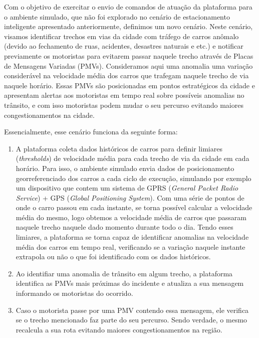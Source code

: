 Com o objetivo de exercitar o envio de comandos de atuação da plataforma para o ambiente simulado, que não foi explorado no cenário de estacionamento inteligente apresentado
anteriormente, definimos um novo cenário.
Neste cenário, visamos identificar trechos em vias da cidade com tráfego de carros anômalo (devido ao fechamento de ruas, acidentes, desastres naturais e etc.) e notificar
previamente os motoristas para evitarem passar naquele trecho através de Placas de Mensagens Variadas (PMVs).
Consideramos aqui uma anomalia uma variação considerável na velocidade média dos carros que trafegam naquele trecho de via naquele horário.
Essas PMVs são posicionadas em pontos estratégicos da cidade e apresentam alertas aos motoristas em tempo real sobre possíveis anomalias no trânsito, e com isso motoristas
podem mudar o seu percurso evitando maiores congestionamentos na cidade.

Essencialmente, esse cenário funciona da seguinte forma:

\begin{enumerate}
    \item A plataforma coleta dados históricos de carros para definir limiares (\textit{thresholds}) de velocidade média para cada trecho de via da cidade em cada horário.
        Para isso, o ambiente simulado envia dados de posicionamento georreferenciado dos carros a cada ciclo de execução, simulando por exemplo um dispositivo que contem um
        sistema de GPRS (\textit{General Packet Radio Service}) + GPS (\textit{Global Positioning System}).
        Com uma série de pontos de onde o carro passou em cada instante, se torna possível calcular a velocidade média do mesmo, logo obtemos a velocidade média de carros
        que passaram naquele trecho naquele dado momento durante todo o dia.
        Tendo esses limiares, a plataforma se torna capaz de identificar anomalias na velocidade média dos carros em tempo real, verificando se a variação naquele instante
        extrapola ou não o que foi identificado com os dados históricos.

    \item Ao identifiar uma anomalia de trânsito em algum trecho, a plataforma identifica as PMVs mais próximas do incidente e atualiza a sua mensagem informando os motoristas
        do ocorrido.

    \item Caso o motorista passe por uma PMV contendo essa mensagem, ele verifica se o trecho mencionado faz parte do seu percurso. Sendo verdade, o mesmo recalcula a sua
        rota evitando maiores congestionamentos na região.
\end{enumerate}

